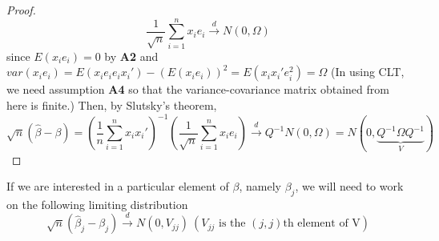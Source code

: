\begin{mdframed}[backgroundcolor=green!5]
\begin{theorem}
\begin{proof}
\[
\frac{1}{\sqrt{n}}\sum_{i=1}^nx_ie_i\xrightarrow{d} N(0,\Omega)
\]
since $E(x_ie_i)=0$ by \textbf{A2} and $var(x_ie_i)= E(x_ie_ie_ix_i')-(E(x_ie_i))^2 = E(x_ix_i'e_i^2)=\Omega$ (In using CLT, we need assumption \textbf{A4} so that the variance-covariance matrix obtained from here is finite.) Then, by Slutsky's theorem, 
\[
\sqrt{n}(\hat{\beta}-\beta)=\left(\frac{1}{n}\sum_{i=1}^nx_ix_i'\right)^{-1}\left(\frac{1}{\sqrt{n}}\sum_{i=1}^nx_ie_i\right)\xrightarrow{d}Q^{-1}N(0,\Omega)=N(0,\underbrace{Q^{-1}\Omega Q^{-1}}_{V})
\]
\end{proof}
\end{theorem}
\end{mdframed} \par
If we are interested in a particular element of $\beta$, namely $\beta_j$, we will need to work on the following limiting distribution
\[
\sqrt{n}(\hat{\beta}_j-\beta_j) \xrightarrow{d} N(0,V_{jj}) \ (V_{jj} \text{ is the $(j,j)$th element of V})
\]

